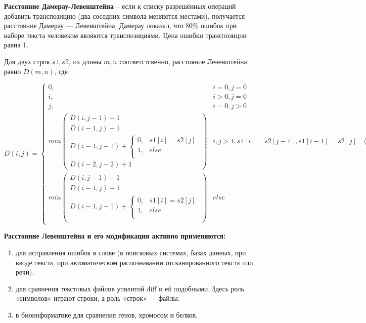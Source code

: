 \documentclass[a4paper,14pt]{article} %
\begin{document}
	\hfill
	
	\textbf{Расстояние Дамерау-Левенштейна} -- если к списку разрешённых операций добавить транспозицию (два соседних символа меняются местами), получается расстояние Дамерау — Левенштейна. Дамерау показал, что 80\%  ошибок при наборе текста человеком являются транспозициями. Цена ошибки транспозиции равна 1. 
	
	\hfill
	
	Для двух строк $s1, s2$, их длины $m, n$ соответстсвенно, расстояние Левенштейна равно $D(m, n)$, где
        
        $$
        D(i, j) = 
        \left\{
		\begin{array}{lll}
 			0 , & i = 0, j = 0  \\
			i , & i > 0, j = 0  \\
			j , &i = 0, j > 0\\
			min
			\left(
				\begin{array}{lll}
					D(i, j - 1) + 1 \\
					D(i - 1, j ) + 1 \\
					D(i - 1 , j - 1) +  
								\left\{
									\begin{array}{lll}
										0, & s1[i] = s2[j] \\
										1, & else \\
									\end{array}
								\right.\\
					D(i - 2,j - 2) + 1
				\end{array}
			\right) & i, j > 1, s1[i] = s2[j - 1], s1[i - 1] = s2[j]  & (2)\\
			min
			\left(
				\begin{array}{lll}
					D(i, j - 1) + 1 \\
					D(i - 1, j ) + 1 \\
					D(i - 1 , j - 1) +  
								\left\{
									\begin{array}{lll}
										0, & s1[i] = s2[j] \\
										1, & else \\
									\end{array}
								\right.\\
				\end{array}
			\right) &else
 		\end{array}
	\right.
        $$
        \hfill
        
        \textbf{Расстояние Левенштейна и его модификация активно применяются:}
	\begin{enumerate}
		\item для исправления ошибок в слове (в поисковых системах, базах данных, при вводе текста, при автоматическом распознавании отсканированного текста или речи).
		\item для сравнения текстовых файлов утилитой diff и ей подобными. Здесь роль «символов» играют строки, а роль «строк» — файлы.
		\item в биоинформатике для сравнения генов, хромосом и белков.
	\end{enumerate}
	
\end{document}
